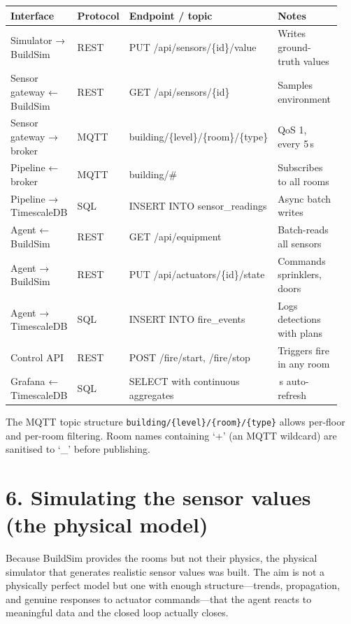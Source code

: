 \documentclass[11pt]{article}
\begin{document}
\begin{longtable}[]{@{}
  >{\raggedright\arraybackslash}p{0.22\linewidth}
  >{\raggedright\arraybackslash}p{0.10\linewidth}
  >{\raggedright\arraybackslash}p{0.32\linewidth}
  >{\raggedright\arraybackslash}p{0.30\linewidth}@{}}
\toprule
\textbf{Interface} & \textbf{Protocol} & \textbf{Endpoint / topic} & \textbf{Notes} \\
\midrule
\endhead
Simulator → BuildSim & REST & PUT /api/sensors/\{id\}/value & Writes ground-truth values \\
Sensor gateway ← BuildSim & REST & GET /api/sensors/\{id\} & Samples environment \\
Sensor gateway → broker & MQTT & building/\{level\}/\{room\}/\{type\} & QoS 1, every 5\,s \\
Pipeline ← broker & MQTT & building/\# & Subscribes to all rooms \\
Pipeline → TimescaleDB & SQL & INSERT INTO sensor\_readings & Async batch writes \\
Agent ← BuildSim & REST & GET /api/equipment & Batch-reads all sensors \\
Agent → BuildSim & REST & PUT /api/actuators/\{id\}/state & Commands sprinklers, doors \\
Agent → TimescaleDB & SQL & INSERT INTO fire\_events & Logs detections with plans \\
Control API & REST & POST /fire/start, /fire/stop & Triggers fire in any room \\
Grafana ← TimescaleDB & SQL & SELECT with continuous aggregates & 5\,s auto-refresh \\
\bottomrule
\end{longtable}

The MQTT topic structure \texttt{building/\{level\}/\{room\}/\{type\}} allows per-floor and per-room filtering. Room names containing `+' (an MQTT wildcard) are sanitised to `\_' before publishing.


\section{6. Simulating the sensor values (the physical model)}

Because BuildSim provides the rooms but not their physics, the physical simulator that generates realistic sensor values was built. The aim is not a physically perfect model but one with enough structure---trends, propagation, and genuine responses to actuator commands---that the agent reacts to meaningful data and the closed loop actually closes.
\end{document}

